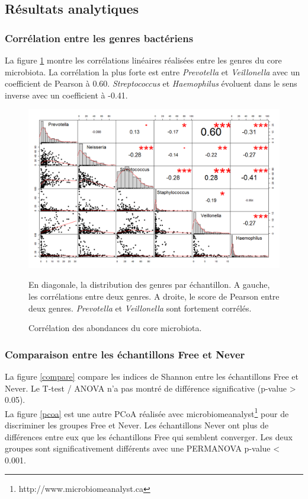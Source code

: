 \documentclass[12pt,a4paper]{article}
\begin{document}
{\begin{table}[!h]
      \label{pyoculture}
  \end{table}


\subsection{Résultats analytiques}
\subsubsection{Corrélation entre les genres bactériens}
La figure \ref{correlation} montre les corrélations linéaires réalisées entre les genres du core microbiota. La corrélation la plus forte est entre \textit{Prevotella} et \textit{Veillonella} avec un coefficient de Pearson à 0.60.  \textit{Streptococcus} et \textit{Haemophilus} évoluent dans le sens inverse avec un coefficient à -0.41.


\begin{figure}[H]
\begin{center}
\includegraphics[scale=0.40]{img/small_correlation.png}\hfill
\end{center}
\caption{Corrélation des abondances du core microbiota.}
En diagonale, la distribution des genres par échantillon. A gauche, les corrélations entre deux genres. A droite, le score de Pearson entre deux genres. \textit{Prevotella} et \textit{Veillonella} sont fortement corrélés.
\label{correlation}
\end{figure}

\subsubsection{Comparaison entre les échantillons Free et Never}
La figure \ref{compare} compare les indices de Shannon entre les échantillons Free et Never. Le T-test / ANOVA n'a pas montré de différence significative (p-value > 0.05). \\
La figure  \ref{pcoa} est une autre PCoA réalisée avec microbiomeanalyst\footnote{http://www.microbiomeanalyst.ca} pour de discriminer les groupes Free et Never. Les échantillons Never ont plus de différences entre eux que les échantillons Free qui semblent converger. Les deux groupes sont significativement différents avec une PERMANOVA p-value < 0.001.

}
\end{document}
